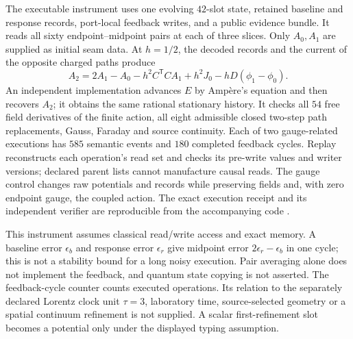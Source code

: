 \documentclass[11pt]{article}
\begin{document}
The executable instrument uses one evolving \(42\)-slot state, retained
baseline and response records, port-local feedback writes, and a public
evidence bundle. It reads all sixty endpoint--midpoint pairs at each of three
slices. Only \(A_0,A_1\) are supplied as initial seam data. At \(h=1/2\), the
decoded records and the current of the opposite charged paths produce
\[
 A_2=2A_1-A_0-h^2C^{\mathsf T}CA_1+h^2J_0-hD(\phi_1-\phi_0).
\]
An independent implementation advances \(E\) by Amp\`ere's equation and then
recovers \(A_2\); it obtains the same rational stationary history. It checks
all \(54\) free field derivatives of the finite action, all eight admissible
closed two-step path replacements, Gauss, Faraday and source continuity.
Each of two gauge-related executions has \(585\) semantic events and
\(180\) completed feedback cycles. Replay reconstructs each operation's read
set and checks its pre-write values and writer versions; declared parent
lists cannot manufacture causal reads. The gauge control changes raw
potentials and records while preserving fields and, with zero endpoint gauge,
the coupled action. The exact execution receipt and its independent verifier
are reproducible from the accompanying code \cite{ophrepo}.

This instrument assumes classical read/write access and exact memory. A
baseline error \(\epsilon_b\) and response error \(\epsilon_r\) give midpoint
error \(2\epsilon_r-\epsilon_b\) in one cycle; this is not a stability bound
for a long noisy execution. Pair averaging alone does not implement the
feedback, and quantum state copying is not asserted. The feedback-cycle
counter counts executed operations. Its relation to the separately declared
Lorentz clock unit \(\tau=3\), laboratory time, source-selected geometry or
a spatial continuum refinement is not supplied. A scalar first-refinement
slot becomes a potential only under the displayed typing assumption.
\end{document}

